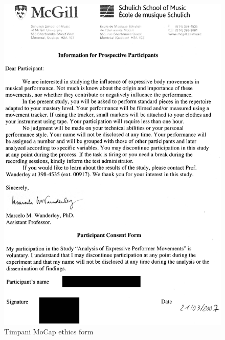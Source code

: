 \begin{figure}[H]
	\begin{center}
		\includegraphics[width=0.9\linewidth]{Appendices/B/Pics/Jpg/Form3.jpg}
	\end{center}
	\vspace{-0.5cm}
	\caption[Timpani MoCap ethics form]{Timpani MoCap ethics form}
	\label{fig:timpaniScore}
\end{figure}

